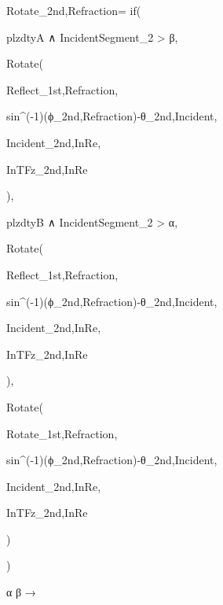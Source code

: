 Rotate_{2nd,Refraction}=
  if(

    plzdtyA ∧ IncidentSegment_2 > β,

    Rotate(

    Reflect_{1st,Refraction},

    sin^(-1)(ϕ_{2nd,Refraction})-θ_{2nd,Incident},

    Incident_{2nd,InRe},

    InTFz_{2nd,InRe}
    
    ),

    plzdtyB ∧ IncidentSegment_2 > α,

    Rotate(

    Reflect_{1st,Refraction},

    sin^(-1)(ϕ_{2nd,Refraction})-θ_{2nd,Incident},

    Incident_{2nd,InRe},

    InTFz_{2nd,InRe}
    
    ),

    Rotate(

    Rotate_{1st,Refraction},

    sin^(-1)(ϕ_{2nd,Refraction})-θ_{2nd,Incident},

    Incident_{2nd,InRe},

    InTFz_{2nd,InRe}
    
    )

  )
  
α
β
→
